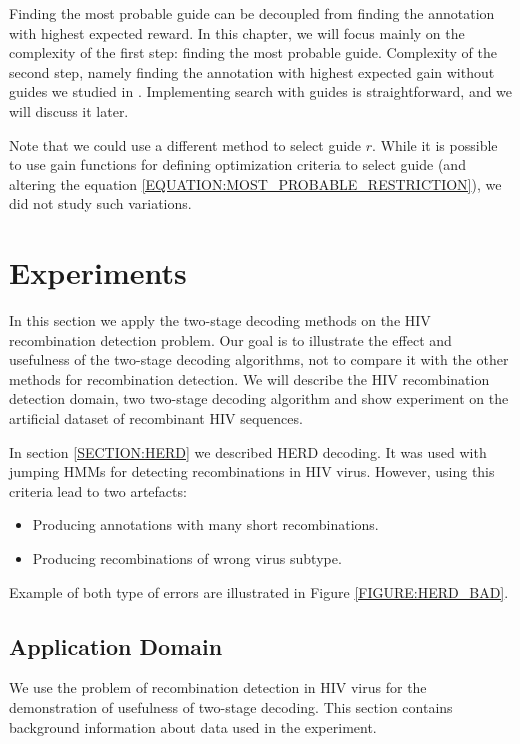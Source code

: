 Finding the most probable guide can be decoupled from finding the
annotation with highest expected reward. In this chapter, we will focus
mainly on the complexity of the first step: finding the most
probable guide. Complexity of the second step, namely finding the annotation
with highest expected gain without guides we studied in \cite{Nanasi2010mgr,
Nanasi2010}. Implementing search with guides is straightforward, and we will
discuss it later.

Note that we could use a different method to select guide $r$. While it is
possible to use gain functions for defining optimization criteria to select
guide (and altering the equation \ref{EQUATION:MOST_PROBABLE_RESTRICTION}), 
we did not study such variations.

\section{Experiments}

In this section we apply the two-stage decoding methods on the HIV
recombination detection problem. Our goal is to illustrate the effect and
usefulness of the two-stage decoding algorithms, not to compare it with the
other methods for recombination detection.  We will describe the HIV
recombination detection domain, two two-stage decoding algorithm and show
experiment on the artificial dataset of recombinant HIV sequences.

In section \ref{SECTION:HERD} we described HERD decoding. It was used with
jumping HMMs \cite{Schultz2006} for detecting recombinations in HIV virus.
However, using this criteria lead to two artefacts: 
\begin{itemize}[itemsep=-1mm]
\item Producing annotations with many short recombinations.  
\item Producing recombinations of wrong virus subtype.  
\end{itemize}
Example of both type of
errors are illustrated in Figure \ref{FIGURE:HERD_BAD}.

\subsection{Application Domain}
We use the problem of recombination detection in HIV virus for the demonstration of
usefulness of two-stage decoding.  This section contains background information
about data used in the experiment.

